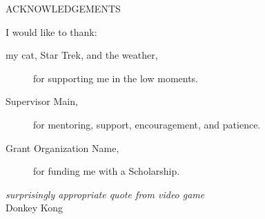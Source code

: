 \newpage
{}

\begin{center}
ACKNOWLEDGEMENTS
\end{center}

\noindent I would like to thank:
\begin{description}
\item[my cat, Star Trek, and the weather,]
	for supporting me in the low moments.
\item[Supervisor Main,]
	for  mentoring, support, encouragement, and patience.
\item[Grant Organization Name,]
	for funding me with a Scholarship.
\end{description}

\begin{flushright}
\textit{surprisingly appropriate quote from video game}
\\
Donkey Kong \\
\end{flushright}
